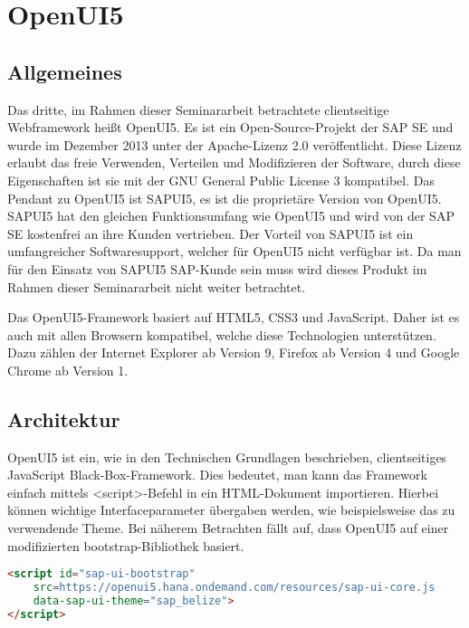
\chapter{OpenUI5}
\label{ch:openUI5}

\section{Allgemeines}

Das dritte, im Rahmen dieser Seminararbeit betrachtete clientseitige Webframework heißt OpenUI5. Es ist ein Open-Source-Projekt der SAP SE und wurde im Dezember 2013 unter der Apache-Lizenz 2.0 veröffentlicht. Diese Lizenz erlaubt das freie Verwenden, Verteilen und Modifizieren der Software, durch diese Eigenschaften ist sie mit der GNU General Public License 3 kompatibel. Das Pendant zu OpenUI5 ist SAPUI5, es ist die proprietäre Version von OpenUI5. SAPUI5 hat den gleichen Funktionsumfang wie OpenUI5 und wird von der SAP SE kostenfrei an ihre Kunden vertrieben. Der Vorteil von SAPUI5 ist ein umfangreicher Softwaresupport, welcher für OpenUI5 nicht verfügbar ist. Da man für den Einsatz von SAPUI5 SAP-Kunde sein muss wird dieses Produkt im Rahmen dieser Seminararbeit nicht weiter betrachtet.

Das OpenUI5-Framework basiert auf HTML5, CSS3 und JavaScript. Daher ist es auch mit allen Browsern kompatibel, welche diese Technologien unterstützen. Dazu zählen der Internet Explorer ab Version 9, Firefox ab Version 4 und Google Chrome ab Version 1. 


\section{Architektur}

OpenUI5 ist ein, wie in den Technischen Grundlagen beschrieben, clientseitiges JavaScript Black-Box-Framework. Dies bedeutet, man kann das Framework einfach mittels <script>-Befehl in ein HTML-Dokument importieren. Hierbei können wichtige Interfaceparameter übergaben werden, wie beispielsweise das zu verwendende Theme. Bei näherem Betrachten fällt auf, dass OpenUI5 auf einer modifizierten bootstrap-Bibliothek basiert. 

\begin{lstlisting}[caption=Beispiel für das Einbinden von OpenUI5, label=lst:UI5Einbinden, language=HTML]
<script id="sap-ui-bootstrap"
	src=https://openui5.hana.ondemand.com/resources/sap-ui-core.js
	data-sap-ui-theme="sap_belize">
</script>
\end{lstlisting}

